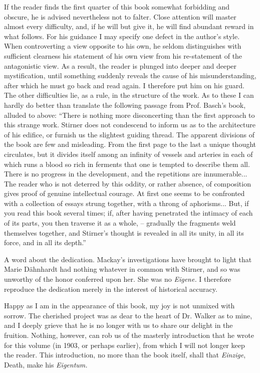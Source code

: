 \documentclass[12pt,a4paper]{book}
\begin{document}
If the reader finds the first quarter of this book somewhat forbidding and 
obscure, he is advised nevertheless not to falter. Close attention will master 
almost every difficulty, and, if he will but give it, he will find abundant 
reward in what follows. For his guidance I may specify one defect in the 
author's style. When controverting a view opposite to his own, he seldom 
distinguishes with sufficient clearness his statement of his own view from his 
re-statement of the antagonistic view. As a result, the reader is plunged into 
deeper and deeper mystification, until something suddenly reveals the cause of 
his misunderstanding, after which he must go back and read again. I therefore 
put him on his guard. The other difficulties lie, as a rule, in the structure 
of the work. As to these I can hardly do better than translate the following 
passage from Prof. Basch's book, alluded to above: ``There is nothing more 
disconcerting than the first approach to this strange work. Stirner does not 
condescend to inform us as to the architecture of his edifice, or furnish us 
the slightest guiding thread. The apparent divisions of the book are few and 
misleading. From the first page to the last a unique thought circulates, but 
it divides itself among an infinity of vessels and arteries in each of which 
runs a blood so rich in ferments that one is tempted to describe them all. 
There is no progress in the development, and the repetitions are 
innumerable... The reader who is not deterred by this oddity, or rather 
absence, of composition gives proof of genuine intellectual courage. At first 
one seems to be confronted with a collection of essays strung together, with a 
throng of aphorisms... But, if you read this book several times; if, after 
having penetrated the intimacy of each of its parts, you then traverse it as a 
whole, -- gradually the fragments weld themselves together, and Stirner's 
thought is revealed in all its unity, in all its force, and in all its 
depth.''

A word about the dedication. Mackay's investigations have brought to light 
that Marie D\"ahnhardt had nothing whatever in common with Stirner, and so was 
unworthy of the honor conferred upon her. She was no \textit{Eigene.} I 
therefore reproduce the dedication merely in the interest of historical 
accuracy.

Happy as I am in the appearance of this book, my joy is not unmixed with 
sorrow. The cherished project was as dear to the heart of Dr. Walker as to 
mine, and I deeply grieve that he is no longer with us to share our delight in 
the fruition. Nothing, however, can rob us of the masterly introduction that 
he wrote for this volume (in 1903, or perhaps earlier), from which I will not 
longer keep the reader. This introduction, no more than the book itself, shall 
that \textit{Einzige}, Death, make his \textit{Eigentum.}
\end{document}
